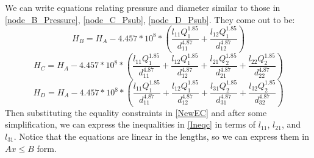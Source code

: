 \documentclass{homework}
\begin{document}
We can write equations relating pressure and diameter similar to those in \ref{node_B_Pressure}, \ref{node_C_Psub}, \ref{node_D_Psub}. They come out to be:
\begin{equation}\label{HB}
H_B = H_A - 4.457*10^8*(\frac{l_{11}Q_1^{1.85}}{d_{11}^{4.87}} + \frac{l_{12}Q_1^{1.85}}{d_{12}^{4.87}})
\end{equation}\label{HC}
\begin{equation}
H_C = H_A - 4.457*10^8*(\frac{l_{11}Q_1^{1.85}}{d_{11}^{4.87}} + \frac{l_{12}Q_1^{1.85}}{d_{12}^{4.87}} + \frac{l_{21}Q_2^{1.85}}{d_{21}^{4.87}} + \frac{l_{22}Q_2^{1.85}}{d_{22}^{4.87}})
\end{equation}
\begin{equation}\label{HD}
H_D = H_A - 4.457*10^8*(\frac{l_{11}Q_1^{1.85}}{d_{11}^{4.87}} + \frac{l_{12}Q_1^{1.85}}{d_{12}^{4.87}} + \frac{l_{31}Q_2^{1.85}}{d_{31}^{4.87}} + \frac{l_{32}Q_2^{1.85}}{d_{32}^{4.87}})
\end{equation}
Then substituting the equality constraints in \ref{NewEC} and after some simplification, we can express the inequalities in \ref{Ineqc} in terms of $l_{11}$, $l_{21}$, and $l_{31}$. Notice that the equations are linear in the lengths, so we can express them in $Ax \leq B$ form.
\end{document}
